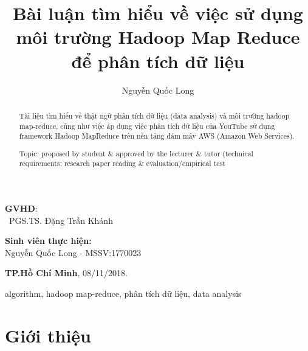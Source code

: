 \documentclass{hcmutarticle}
\begin{document}
\vspace{2cm}

\begin{minipage}[t]{0.60\linewidth}
\textbf{GVHD}: \\
\ PGS.TS. Đặng Trần Khánh
\end{minipage}
\begin{minipage}[t]{0.40\linewidth}
\textbf{Sinh viên thực hiện:}\\
Nguyễn Quốc Long - MSSV:1770023
\end{minipage}

\vspace{4cm}

\begin{center}

\textbf{TP.Hồ Chí Minh},
08/11/2018.

\end{center}



\newpage

\tableofcontents 

\newpage

\title{Bài luận tìm hiểu về việc sử dụng môi trường Hadoop Map Reduce để phân tích dữ liệu }

\author{  Nguyễn Quốc Long} 





\maketitle


\begin{abstract}
Tài liệu tìm hiểu về thật ngữ phân tích dữ liệu (data analysis) và môi trường hadoop map-reduce, cũng như việc áp dụng việc phân tích dữ liệu của YouTube sử dụng framework Hadoop MapReduce trên nền tảng đám mây AWS (Amazon Web Services).

Topic: proposed by student \& approved by the lecturer \& tutor (technical requirements: research paper reading \& evaluation/empirical test
\end{abstract}

\begin{keywords}
algorithm, hadoop map-reduce, phân tích dữ liệu, data analysis
\end{keywords} 


\section{Giới thiệu}
\end{document}

